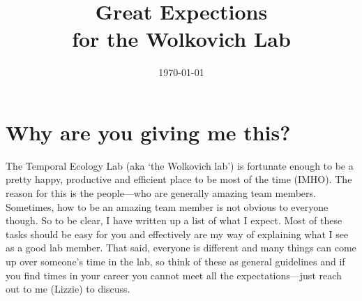 \documentclass[11pt,a4paper,oneside]{article}
\begin{document}



\title{Great Expections\\ for the Wolkovich Lab}
\date{\today}
\maketitle

\section{Why are you giving me this?}
The Temporal Ecology Lab (aka `the Wolkovich lab') is fortunate enough to be a pretty happy, productive and efficient place to be most of the time (IMHO). The reason for this is the people---who are generally amazing team members. \\

\noindent Sometimes, how to be an amazing team member is not obvious to everyone though. So to be clear, I have written up a list of what I expect. Most of these tasks should be easy for you and effectively are my way of explaining what I see as a good lab member. That said, everyone is different and many things can come up over someone's time in the lab, so think of these as general guidelines and if you find times in your career you cannot meet all the expectations---just reach out to me (Lizzie) to discuss. 
\end{document}
